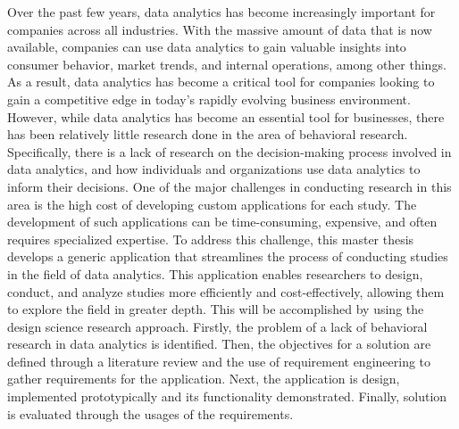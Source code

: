 Over the past few years, data analytics has become increasingly important for companies across all industries. With the massive amount of data that is now available, companies can use data analytics to gain valuable insights into consumer behavior, market trends, and internal operations, among other things. As a result, data analytics has become a critical tool for companies looking to gain a competitive edge in today's rapidly evolving business environment. However, while data analytics has become an essential tool for businesses, there has been relatively little research done in the area of behavioral research. Specifically, there is a lack of research on the decision-making process involved in data analytics, and how individuals and organizations use data analytics to inform their decisions. One of the major challenges in conducting research in this area is the high cost of developing custom applications for each study. The development of such applications can be time-consuming, expensive, and often requires specialized expertise. To address this challenge, this master thesis develops a generic application that streamlines the process of conducting studies in the field of data analytics. This application enables researchers to design, conduct, and analyze studies more efficiently and cost-effectively, allowing them to explore the field in greater depth. This will be accomplished by using the design science research approach. Firstly, the problem of a lack of behavioral research in data analytics is identified. Then, the objectives for a solution are defined through a literature review and the use of requirement engineering to gather requirements for the application. Next, the application is design, implemented prototypically and its functionality demonstrated. Finally, solution is evaluated through the usages of the requirements.
\newpage